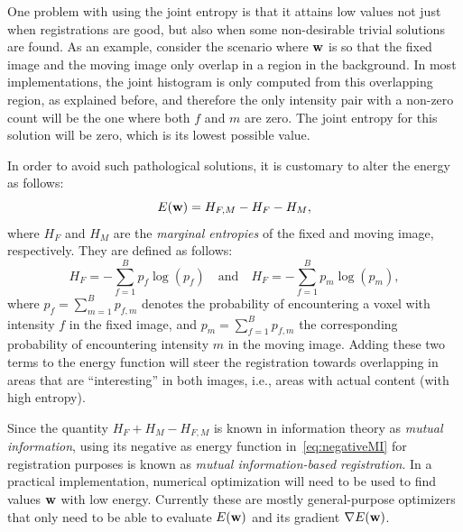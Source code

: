 \documentclass[10pt,twoside]{book}
\begin{document}
%
One problem with using the joint entropy is that it attains low values not just when registrations are good, but also when some non-desirable trivial solutions are found. As an example, consider the scenario where $\mathbf{w}$ is so that the fixed image and the moving image only overlap in a region in the background. In most implementations, the joint histogram is only computed from this overlapping region, as explained before, and therefore the only intensity pair with a non-zero count will be the one where both $f$ and $m$ are zero. The joint entropy for this solution will be zero, which is its lowest possible value.

In order to avoid such pathological solutions, it is customary to alter the energy as follows:
\begin{equation}
E(\mathbf{w}) = H_{F,M} - H_{F} - H_{M}
,
\label{eq:negativeMI}
\end{equation}
where $H_{F}$ and $H_{M}$ are the \emph{marginal entropies} of the fixed and moving image, respectively. 
They are defined as follows:
$$
H_{F} = -\sum_{f=1}^{B} p_f \log( p_f )
\quad
\text{and}
\quad
H_{F} = -\sum_{f=1}^{B} p_m \log( p_m ),
$$
where $p_f = \sum_{m=1}^B p_{f,m}$
denotes the probability of encountering a voxel 
with intensity $f$
in the fixed image, 
and $p_m = \sum_{f=1}^B p_{f,m}$
the corresponding probability of encountering intensity $m$ in the moving image.
%
Adding these two terms to the energy function will steer the registration towards overlapping in areas that are ``interesting'' in both images, i.e., areas with actual content (with high entropy).

Since the quantity
$
H_{F} + H_{M} - H_{F,M}  
$
is known in information theory as \emph{mutual information}, using its negative as energy function in~\eqref{eq:negativeMI} for registration purposes is known as \emph{mutual information-based registration}.
%
In a practical implementation, numerical optimization will need to be used to find values $\mathbf{w}$ with low energy. Currently these are mostly general-purpose optimizers that only need to be able to evaluate $E(\mathbf{w})$ and its gradient $\nabla E(\mathbf{w})$.
\end{document}

